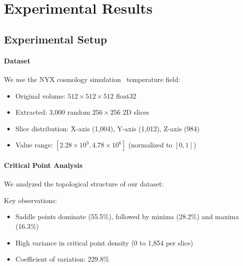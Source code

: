 \section{Experimental Results}
\label{sec:experiments}


\subsection{Experimental Setup}

\paragraph{Dataset}
We use the NYX cosmology simulation~\cite{nyx2013} temperature field:
\begin{itemize}
    \item Original volume: $512 \times 512 \times 512$ float32
    \item Extracted: 3,000 random $256 \times 256$ 2D slices
    \item Slice distribution: X-axis (1,004), Y-axis (1,012), Z-axis (984)
    \item Value range: $[2.28 \times 10^3, 4.78 \times 10^6]$ (normalized to $[0, 1]$)
\end{itemize}

\paragraph{Critical Point Analysis}
We analyzed the topological structure of our dataset:



Key observations:
\begin{itemize}
    \item Saddle points dominate (55.5\%), followed by minima (28.2\%) and maxima (16.3\%)
    \item High variance in critical point density (0 to 1,854 per slice)
    \item Coefficient of variation: 229.8\%
\end{itemize}


